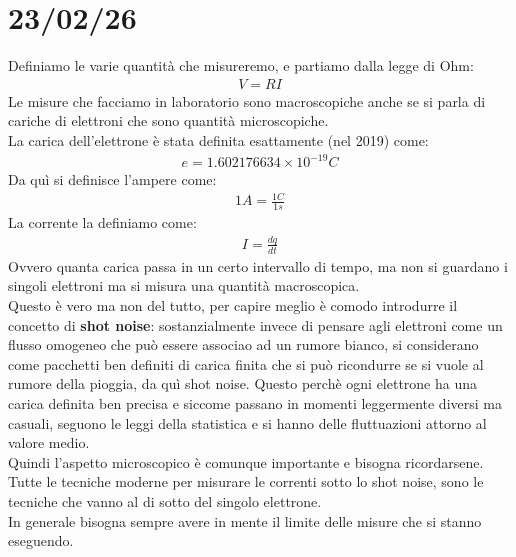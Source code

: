 \documentclass[a4paper, oneside]{article}
\begin{document}
\section{23/02/26}
Definiamo le varie quantità che misureremo, e partiamo dalla legge di Ohm:
\begin{gather*}
    V = R I
\end{gather*}
Le misure che facciamo in laboratorio sono macroscopiche anche se si parla di cariche di elettroni che sono quantità microscopiche.\\
La carica dell'elettrone è stata definita esattamente (nel 2019) come:
\begin{gather*}
    e = 1.602176634 \times 10^{-19} C
\end{gather*}
Da quì si definisce l'ampere come:
\begin{gather*}
    1 A = \frac{1 C}{1 s}
\end{gather*}
La corrente la definiamo come:
\begin{gather*}
    I = \frac{dq}{dt}
\end{gather*}
Ovvero quanta carica passa in un certo intervallo di tempo, ma non si guardano i singoli elettroni ma si misura una quantità macroscopica.\\
Questo è vero ma non del tutto, per capire meglio è comodo introdurre il concetto di \textbf{shot noise}: sostanzialmente invece di pensare agli elettroni 
come un flusso omogeneo che può essere associao ad un rumore bianco, si considerano come pacchetti ben definiti 
di carica finita che si può ricondurre se si vuole al rumore della pioggia, da quì shot noise. Questo perchè ogni elettrone ha una carica 
definita ben precisa e siccome passano in momenti leggermente diversi ma casuali, seguono le leggi della statistica e si hanno delle fluttuazioni attorno al valore medio.\\
Quindi l'aspetto microscopico è comunque importante e bisogna ricordarsene.\\
Tutte le tecniche moderne per misurare le correnti sotto lo shot noise, sono le tecniche che vanno al di sotto del singolo elettrone.\\
In generale bisogna sempre avere in mente il limite delle misure che si stanno eseguendo.\\
\end{document}
